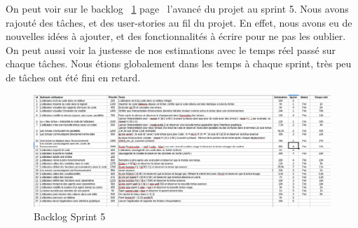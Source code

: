 On peut voir sur le backlog ~\ref{bsp5} page~\pageref{bsp5} l'avancé du projet au sprint 5.
Nous avons rajouté des tâches, et des user-stories au fil du projet. En effet, nous avons eu de nouvelles idées à ajouter, et des fonctionnalités à écrire pour ne pas les oublier.
On peut aussi voir la justesse de nos estimations avec le temps réel passé sur chaque tâches.
Nous étions globalement dans les temps à chaque sprint, très peu de tâches ont été fini en retard.


\begin{figure}[h]
\caption{\label{bsp5} Backlog Sprint 5}
\includegraphics[scale=0.35]{doc/gestionProjet/backlogsp5.png}
\end{figure}
